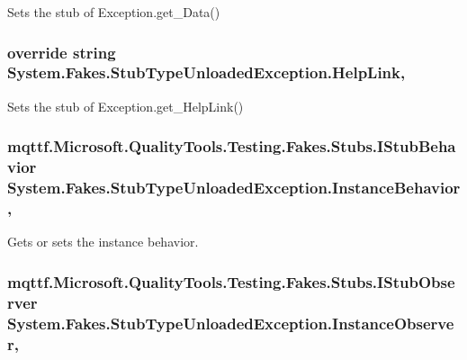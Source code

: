 Sets the stub of Exception.\-get\-\_\-\-Data()

\hypertarget{class_system_1_1_fakes_1_1_stub_type_unloaded_exception_a13303f8275b07e28f2379a5c435e0a9c}{
\subsubsection[{Help\-Link}]{\setlength{\rightskip}{0pt plus 5cm}override string System.\-Fakes.\-Stub\-Type\-Unloaded\-Exception.\-Help\-Link\hspace{0.3cm}{\ttfamily [get]}, {\ttfamily [set]}}}\label{class_system_1_1_fakes_1_1_stub_type_unloaded_exception_a13303f8275b07e28f2379a5c435e0a9c}


Sets the stub of Exception.\-get\-\_\-\-Help\-Link()

\hypertarget{class_system_1_1_fakes_1_1_stub_type_unloaded_exception_a497ed575e5222abbcdcd417c4532a51a}{
\subsubsection[{Instance\-Behavior}]{\setlength{\rightskip}{0pt plus 5cm}mqttf.\-Microsoft.\-Quality\-Tools.\-Testing.\-Fakes.\-Stubs.\-I\-Stub\-Behavior System.\-Fakes.\-Stub\-Type\-Unloaded\-Exception.\-Instance\-Behavior\hspace{0.3cm}{\ttfamily [get]}, {\ttfamily [set]}}}\label{class_system_1_1_fakes_1_1_stub_type_unloaded_exception_a497ed575e5222abbcdcd417c4532a51a}


Gets or sets the instance behavior.

\hypertarget{class_system_1_1_fakes_1_1_stub_type_unloaded_exception_a6afe709ae7fe6b4f82348106509f51b0}{
\subsubsection[{Instance\-Observer}]{\setlength{\rightskip}{0pt plus 5cm}mqttf.\-Microsoft.\-Quality\-Tools.\-Testing.\-Fakes.\-Stubs.\-I\-Stub\-Observer System.\-Fakes.\-Stub\-Type\-Unloaded\-Exception.\-Instance\-Observer\hspace{0.3cm}{\ttfamily [get]}, {\ttfamily [set]}}}\label{class_system_1_1_fakes_1_1_stub_type_unloaded_exception_a6afe709ae7fe6b4f82348106509f51b0}


